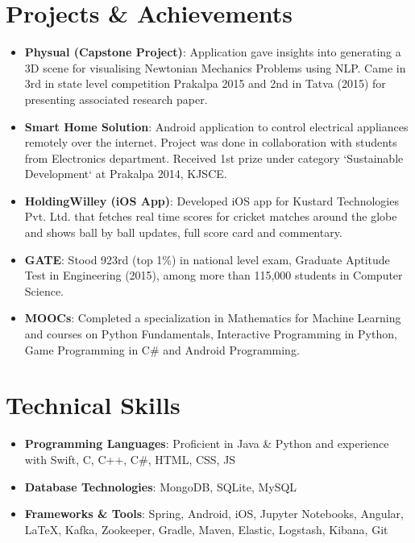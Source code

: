\documentclass[letterpaper,11pt]{article}
\newcommand{\resumeItem}[2]{
	\item\normalsize{
		\textbf{#1}{: #2}
	}
}
\newcommand{\resumeSubItem}[2]{\resumeItem{#1}{#2}\vspace{-4pt}}
\newcommand{\resumeSubHeadingListStart}{\begin{itemize}[leftmargin=*]}
\newcommand{\resumeSubHeadingListEnd}{\end{itemize}}
\begin{document}
	
	
	
	\section{Projects \& Achievements}
	\resumeSubHeadingListStart
	\resumeSubItem{Physual (Capstone Project)}
	{Application gave insights into generating a 3D scene for visualising Newtonian Mechanics Problems using NLP. Came in 3rd in state level competition Prakalpa 2015 and 2nd in Tatva (2015) for presenting associated research paper.}
	\resumeSubItem{Smart Home Solution}
	{Android application to control electrical appliances remotely over the internet. Project was done in collaboration with students from Electronics department. Received 1st prize under category ‘Sustainable Development‘ at Prakalpa 2014, KJSCE.}
	\resumeSubItem{HoldingWilley (iOS App)}
	{Developed iOS app for Kustard Technologies Pvt. Ltd. that fetches real time scores for cricket matches around the globe and shows ball by ball updates, full score card and  commentary.}
	\resumeSubItem{GATE}
	{Stood 923rd (top 1\%) in national level exam, Graduate Aptitude Test in Engineering (2015), among more than 115,000 students in Computer Science.}
	\resumeSubItem{MOOCs}
	{Completed a specialization in Mathematics for Machine Learning and courses on Python Fundamentals, Interactive Programming in Python, Game Programming in C\# and Android Programming.}
	\resumeSubHeadingListEnd
	
	
	\section{Technical Skills}
	\resumeSubHeadingListStart
	\item{
		\textbf{Programming Languages}{: Proficient in Java \& Python and experience with Swift, C, C++, C\#, HTML, CSS, JS}}
	\vspace{-8pt}
	\item{
		\textbf{Database Technologies}{: MongoDB, SQLite, MySQL}}
	\vspace{-8pt}
	\item{
		\textbf{Frameworks \& Tools}{: Spring, Android, iOS, Jupyter Notebooks, Angular, \LaTeX, Kafka, Zookeeper, Gradle, Maven, Elastic, Logstash, Kibana, Git}}
	\resumeSubHeadingListEnd
	
	
\end{document}
